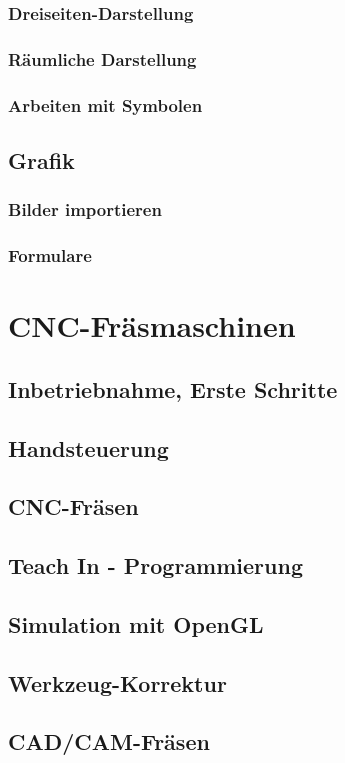 \documentclass[a4paper]{book}
\begin{document}
		\subsection{Dreiseiten-Darstellung}
		\subsection{Räumliche Darstellung}
		\subsection{Arbeiten mit Symbolen}
	\section{Grafik}
		\subsection{Bilder importieren}
		\subsection{Formulare}
	 
\chapter{CNC-Fräsmaschinen} 
	\section{Inbetriebnahme, Erste Schritte}
	\section{Handsteuerung}
	\section{CNC-Fräsen}
	\section{Teach In - Programmierung} 
	\section{Simulation mit OpenGL} 
	\section{Werkzeug-Korrektur} 
	\section{CAD/CAM-Fräsen} 
\end{document}
